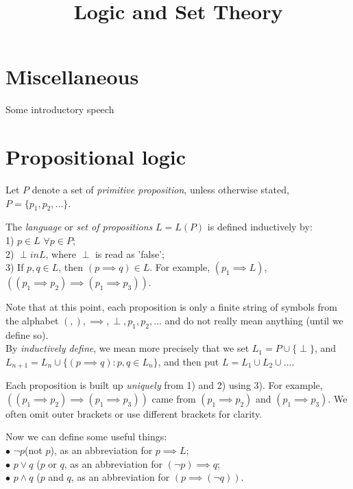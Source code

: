 \documentclass[a4paper]{article}
\begin{document}
\title{Logic and Set Theory}

\maketitle

\newpage

\tableofcontents

\newpage

\section{Miscellaneous}

Some introductory speech

\newpage

\section{Propositional logic}
Let $P$ denote a set of \emph{primitive proposition}, unless otherwise stated, $P=\{p_1,p_2,...\}$.

The \emph{language} or \emph{set of propositions} $L=L(P)$ is defined inductively by:\\
1) $p \in L$ $\forall p \in P$;\\
2) $\perp in L$, where $\perp$ is read as 'false';\\
3) If $p,q \in L$, then $(p \implies q) \in L$. For example, $(p_1 \implies L)$, $((p_1 \implies p_2) \implies (p_1 \implies p_3))$.

Note that at this point, each proposition is only a finite string of symbols from the alphabet $(,),\implies,\perp,p_1,p_2,...$ and do not really mean anything (until we define so).\\
By \emph{inductively define}, we mean more precisely that we set $L_1 = P \cup \{\perp\}$, and $L_{n+1} = L_n \cup \{(p \implies q):p,q \in L_n\}$, and then put $L = L_1 \cup L_2 \cup ...$.

Each proposition is built up \emph{uniquely} from 1) and 2) using 3). For example, $((p_1 \implies p_2) \implies (p_1 \implies p_3))$ came from $(p_1 \implies p_2)$ and $(p_1 \implies p_3)$. We often omit outer brackets or use different brackets for clarity.

Now we can define some useful things:\\
$\bullet$ $\neg p$(not $p$), as an abbreviation for $p \implies L$;\\
$\bullet$ $p \vee q$ ($p$ or $q$, as an abbreviation for $(\neg p) \implies q$;\\
$\bullet$ $p \wedge q$ ($p$ and $q$, as an abbreviation for $(p \implies (\neg q))$.
\end{document}
